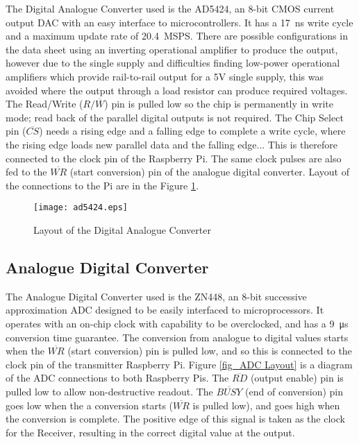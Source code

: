 \documentclass[../main.tex]{subfiles}
\begin{document}
The Digital Analogue Converter used is the AD5424, an 8-bit CMOS current output DAC with an easy interface to microcontrollers.
It has a \SI{17}{\nano\second} write cycle and a maximum update rate of \SI{20.4}{MSPS}. %
There are possible configurations in the data sheet using an inverting operational amplifier to produce the output, however due to the single supply and difficulties finding low-power operational amplifiers which provide rail-to-rail output for a 5V single supply, this was avoided where the output through a load resistor can produce required voltages.
The Read/Write ($R/\overline{W}$) pin is pulled low so the chip is permanently in write mode; read back of the parallel digital outputs is not required.
The Chip Select pin ($\overline{CS}$) needs a rising edge and a falling edge to complete a write cycle, where the rising edge loads new parallel data and the falling edge...
This is therefore connected to the clock pin of the Raspberry Pi.
The same clock pulses are also fed to the $\overline{WR}$ (start conversion) pin of the analogue digital converter.
Layout of the connections to the Pi are in the Figure \ref{fig_DAC Layout}.\\

\begin{figure}[ht]
	\centering
	\texttt{[image: ad5424.eps]}
	\caption{Layout of the Digital Analogue Converter}
	\label{fig_DAC Layout}
\end{figure}

\subsection{Analogue Digital Converter}

The Analogue Digital Converter used is the ZN448, an 8-bit successive approximation ADC designed to be easily interfaced to microprocessors.
It operates with an on-chip clock with capability to be overclocked, and has a \SI{9}{\micro\second} conversion time guarantee.
The conversion from analogue to digital values starts when the $\overline{WR}$ (start conversion) pin is pulled low, and so this is connected to the clock pin of the transmitter Raspberry Pi.
Figure \ref{fig_ADC Layout} is a diagram of the ADC connections to both Raspberry Pis.
The $\overline{RD}$ (output enable) pin is pulled low to allow non-destructive readout.
The $\overline{BUSY}$ (end of conversion) pin goes low when the a conversion starts ($\overline{WR}$ is pulled low), and goes high when the conversion is complete.
The positive edge of this signal is taken as the clock for the Receiver, resulting in the correct digital value at the output.\\
\end{document}
